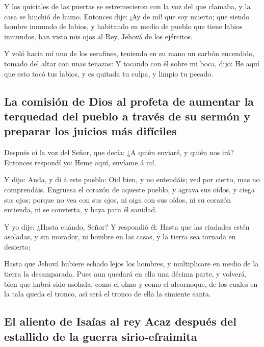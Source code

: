  Y los quiciales de las puertas se estremecieron con la voz
del que clamaba, y la casa se hinchió de humo.  Entonces
dije: ¡Ay de mí! que soy muerto; que siendo hombre inmundo de labios, y
habitando en medio de pueblo que tiene labios inmundos, han visto mis
ojos al Rey, Jehová de los ejércitos.

 Y voló hacia mí uno de los serafines, teniendo en su mano
un carbón encendido, tomado del altar con unas tenazas:  Y
tocando con él sobre mi boca, dijo: He aquí que esto tocó tus labios, y
es quitada tu culpa, y limpio tu pecado.

\hypertarget{la-comisiuxf3n-de-dios-al-profeta-de-aumentar-la-terquedad-del-pueblo-a-travuxe9s-de-su-sermuxf3n-y-preparar-los-juicios-muxe1s-difuxedciles}{%
\subsection{La comisión de Dios al profeta de aumentar la terquedad del
pueblo a través de su sermón y preparar los juicios más
difíciles}\label{la-comisiuxf3n-de-dios-al-profeta-de-aumentar-la-terquedad-del-pueblo-a-travuxe9s-de-su-sermuxf3n-y-preparar-los-juicios-muxe1s-difuxedciles}}

 Después oí la voz del Señor, que decía: ¿A quién enviaré, y
quién nos irá? Entonces respondí yo: Heme aquí, envíame á mí.

 Y dijo: Anda, y di á este pueblo: Oid bien, y no entendáis;
ved por cierto, mas no comprendáis.  Engruesa el corazón de
aqueste pueblo, y agrava sus oídos, y ciega sus ojos; porque no vea con
sus ojos, ni oiga con sus oídos, ni su corazón entienda, ni se
convierta, y haya para él sanidad.

 Y yo dije: ¿Hasta cuándo, Señor? Y respondió él: Hasta que
las ciudades estén asoladas, y sin morador, ni hombre en las casas, y la
tierra sea tornada en desierto;

 Hasta que Jehová hubiere echado lejos los hombres, y
multiplicare en medio de la tierra la desamparada.  Pues
aun quedará en ella una décima parte, y volverá, bien que habrá sido
asolada: como el olmo y como el alcornoque, de los cuales en la tala
queda el tronco, así será el tronco de ella la simiente santa.

\hypertarget{el-aliento-de-isauxedas-al-rey-acaz-despuuxe9s-del-estallido-de-la-guerra-sirio-efraimita}{%
\subsection{El aliento de Isaías al rey Acaz después del estallido de la
guerra
sirio-efraimita}\label{el-aliento-de-isauxedas-al-rey-acaz-despuuxe9s-del-estallido-de-la-guerra-sirio-efraimita}}

